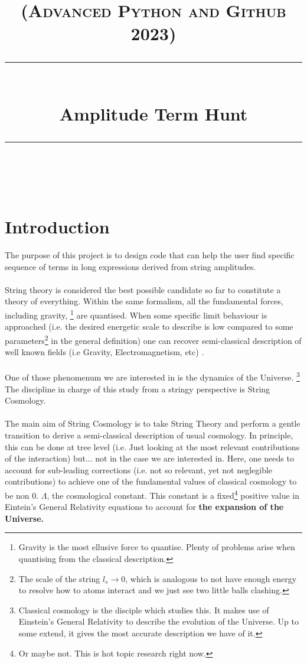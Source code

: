 \documentclass[11pt]{article} %
\title{	
	\normalfont\normalsize
	\textsc{(Advanced Python and Github 2023)}\\ %
	\vspace{5pt} %
	\rule{\linewidth}{0.2pt}\\ %
	\vspace{10pt} %
	{\huge Amplitude Term Hunt}\\ %
	\vspace{1pt} %
	\rule{\linewidth}{2pt}\\ %
	\vspace{-35pt} %
	\date{}
}
\begin{document}
\maketitle 


\section{Introduction}

The purpose of this project is to design code that can help the user find specific sequence of terms in long expressions derived from string amplitudes.\\
\\
String theory is considered the best possible candidate so far to constitute a theory of everything. Within the same formalism, all the fundamental forces, including gravity, \footnote{Gravity is the most ellusive force to quantise. Plenty of problems arise when quantising from the classical description.} are quantised. When some specific limit behaviour is approached (i.e. the desired energetic scale to describe is low compared to some parameters\footnote{The scale of the string $\textit{l}_{s} \rightarrow 0$, which is analogous to not have enough energy to resolve how to atoms interact and we just see two little balls clashing.} in the general definition) one can recover semi-classical description of well known fields (i.e Gravity, Electromagnetism, etc) .\\
\\
One of those phenomenum we are interested in is the dynamics of the Universe. \footnote{Classical cosmology is the disciple which studies this. It makes use of Einstein's General Relativity to describe the evolution of the Universe. Up to some extend, it gives the most accurate description we have of it.} The discipline in charge of this study from a stringy perspective is String Cosmology.\\
\\
The main aim of String Cosmology is to take String Theory and perform a gentle transition to derive a semi-classical description of usual cosmology. In principle, this can be done at tree level (i.e. Just looking at the most relevant contributions of the interaction) but... not in the case we are interested in. Here, one needs to account for sub-leading corrections (i.e. not so relevant, yet not neglegible contributions) to achieve one of the fundamental values of classical cosmology to be non 0. $\Lambda$, the cosmological constant. This constant is a fixed\footnote{Or maybe not. This is hot topic research right now.} positive value in Eintein's General Relativity equations to account for \textbf{the expansion of the Universe.}\\
\end{document}

